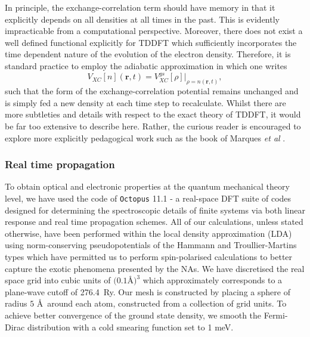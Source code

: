 In principle, the exchange-correlation term should have memory in that it explicitly depends on all densities at all times in the past. This is evidently impracticable from a computational perspective. Moreover, there does not exist a well defined functional explicitly for TDDFT which sufficiently incorporates the time dependent nature of the evolution of the electron density. Therefore, it is standard practice to employ the adiabatic approximation in which one writes
\begin{equation}
    V_{XC}[n](\textbf{r},t) = V_{XC}^{gs}[\rho]|_{\rho = n(\textbf{r},t)},
    \label{eqn:adiabaticVxc}
\end{equation}
such that the form of the exchange-correlation potential remains unchanged and is simply fed a new density at each time step to recalculate. Whilst there are more subtleties and details with respect to the exact theory of TDDFT, it would be far too extensive to describe here. Rather, the curious reader is encouraged to explore more explicitly pedagogical work such as the book of Marques \textit{et al} \cite{TDDFT_Fun_Book}.




\subsubsection{Real time propagation}
\label{sec:TDDFT_Thr}
To obtain optical and electronic properties at the quantum mechanical theory level, we have used the code of \texttt{Octopus} 11.1 \cite{Octopus2003,Octopus_2006,Oct_2015,Oct_paralel,Oct_2020} - a real-space DFT suite of codes designed for determining the spectroscopic details of finite systems via both linear response and real time propagation schemes. All of our calculations, unless stated otherwise, have been performed within the local density approximation (LDA) \cite{KS} using norm-conserving pseudopotentials of the Hammann \cite{Hamann} and Troullier-Martins \cite{Troullier} types \cite{FHI} which have permitted us to perform spin-polarised calculations to better capture the exotic phenomena presented by the NAs. We have discretised the real space grid into cubic units of $(0.1$\AA$)^{3}$ which approximately corresponds to a plane-wave cutoff of 276.4~Ry. Our mesh is constructed by placing a sphere of radius $5$ \AA \ around each atom, constructed from a collection of grid units. To achieve better convergence of the ground state density, we smooth the Fermi-Dirac distribution with a cold smearing function \cite{Smearing} set to 1 meV.


